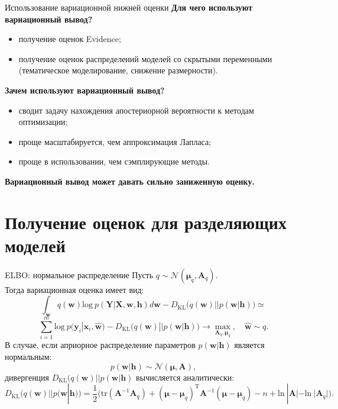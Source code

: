 \documentclass[usenames,dvipsnames,10pt,pdf,utf8,russian,aspectratio=43]{beamer}
\begin{document}
\begin{frame}{Использование вариационной нижней оценки}
\textbf{Для чего используют вариационный вывод?}
\begin{itemize}
\item получение оценок Evidence;
\item получение оценок распределений моделей со скрытыми переменными (тематическое моделирование, снижение размерности).
\end{itemize}

\textbf{Зачем используют вариационный вывод?}
\begin{itemize}
\item сводит задачу нахождения апостериорной вероятности к методам оптимизации;
\item проще масштабируется, чем аппроксимация Лапласа;
\item проще в использовании, чем сэмплирующие методы.
\end{itemize}
\textbf{Вариационный вывод может давать сильно заниженную оценку.}
\end{frame}


\section{Получение оценок для разделяющих моделей}
\begin{frame}{ELBO: нормальное распределение}
Пусть $q \sim \mathcal{N}(\boldsymbol{\mu}_q, \mathbf{A}_q).$\\
Тогда вариационная оценка имеет вид:
$$
\int_{\mathbf{w}} q(\mathbf{w})\text{log}~{p(\mathbf{Y}|\mathbf{X},\mathbf{w},\mathbf{h})} d \mathbf{w} - D_\text{KL}\bigl(q (\mathbf{w} )|| p (\mathbf{w}|\mathbf{h})\bigr) \simeq
$$
$$
\sum_{i=1}^m \text{log}~p(\mathbf{y}_i|\mathbf{x}_i, \hat{\mathbf{w}}) - D_\text{KL}\bigl(q (\mathbf{w} )|| p (\mathbf{w}|\mathbf{h})\bigr) \to \max_{\mathbf{A}_q, \boldsymbol{\mu}_q}, \quad \hat{\mathbf{w}} \sim q.
$$
В случае, если априорное распределение параметров $p(\mathbf{w}|\mathbf{h})$ является нормальным: 
$$
p(\mathbf{w}|\mathbf{h}) \sim \mathcal{N}(\boldsymbol{\mu}, \mathbf{A}),
$$
дивергенция $D_\text{KL}\bigl(q (\mathbf{w} )|| p (\mathbf{w}|\mathbf{h})$ вычисляется аналитически:
$$
D_\text{KL}\bigl(q (\mathbf{w}) || p (\mathbf{w}|\mathbf{h})\bigr) = \frac{1}{2} \bigl( \text{tr} (\mathbf{A}^{-1}\mathbf{A}_q) + (\boldsymbol{\mu} - \boldsymbol{\mu}_q)^\text{T}\mathbf{A}^{-1}(\boldsymbol{\mu} - \boldsymbol{\mu}_q) - n +\text{ln}~|\mathbf{A}| - \text{ln}~|\mathbf{A}_q| \bigr).
$$
\end{frame}
\end{document}
